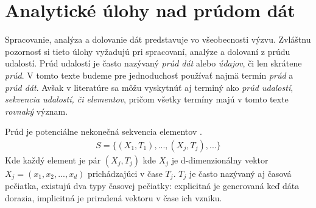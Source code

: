 \chapter{Analytické úlohy nad prúdom dát}
\label{Analytické úlohy v prúde dát}
Spracovanie, analýza a dolovanie dát predstavuje vo všeobecnosti výzvu. Zvláštnu pozornosť si tieto úlohy vyžadujú pri spracovaní, analýze a dolovaní z prúdu udalostí. Prúd udalostí je často nazývaný \textit{prúd dát} alebo \textit{údajov}, či len skrátene \textit{prúd}. V tomto texte budeme pre jednoduchosť používať najmä termín \textit{prúd} a \textit{prúd dát}. Avšak v literatúre sa môžu vyskytnúť aj terminý ako \textit{prúd udalostí}, \textit{sekvencia udalostí, či elementov}, pričom všetky termíny majú v tomto texte \textit{rovnaký} význam. 
\par
\begin{definition}{Prúd je potenciálne nekonečná sekvencia elementov \citep{tran2014change}.}
\begin{align*}
	S = \{(X_1,T_1), ..., (X_j,T_j), ...\}
\end{align*}
Kde každý element je pár $(X_j,T_j)$ kde $X_j$ je d-dimenzionálny vektor $X_j = (x_1, x_2, ..., x_d)$ prichádzajúci v čase $T_j$. $T_j$ je často nazývaný aj časová pečiatka, existujú dva typy časovej pečiatky: explicitná je generovaná keď dáta dorazia, implicitná je priradená vektoru v čase ich vzniku.
\end{definition}

